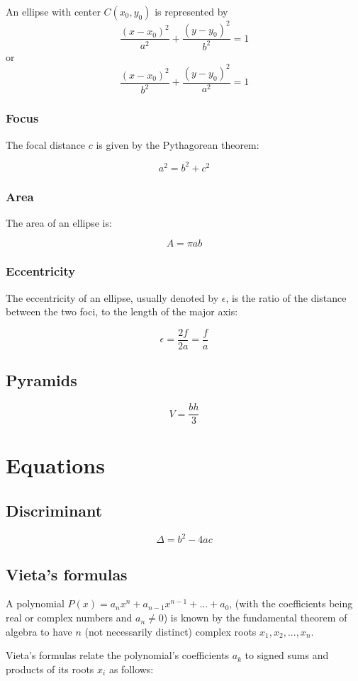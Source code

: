 \documentclass[oneside]{book} %
\theoremstyle{plain}
\begin{document}
An ellipse with center \(C \left( x_0, y_0 \right)\) is represented by
\[\frac{\left(x - x_0\right)^2}{a^2}+\frac{\left(y - y_0\right)^2}{b^2}=1\]
or
\[\frac{\left(x - x_0\right)^2}{b^2}+\frac{\left(y - y_0\right)^2}{a^2}=1\]
\subsection{Focus}
The focal distance \(c\) is given by the Pythagorean theorem:

\[a^2=b^2+c^2\]

\subsection{Area}
The area of an ellipse is:

\[A = \pi a b\]

\subsection{Eccentricity}
The eccentricity of an ellipse, usually denoted by \(\epsilon\), is the ratio of
the distance between the two foci, to the length of the major axis:

\[\epsilon = \frac{2f}{2a} = \frac{f}{a}\]

\section{Pyramids}
\[V = \frac{bh}{3}\]

\chapter{Equations}
\section{Discriminant}
\[\Delta = b^2 - 4ac\]

\section{Vieta's formulas}
A polynomial \(P(x) = a_n x^n + a_{n-1} x^{n-1} + ... + a_0\), (with the
coefficients being real or complex numbers and \(a_n \neq 0\)) is known by the
fundamental theorem of algebra to have \(n\) (not necessarily distinct) complex
roots \(x_1, x_2, ..., x_n\).

Vieta's formulas relate the polynomial's coefficients \(a_k\) to signed sums
and products of its roots \(x_i\) as follows:
\end{document}
